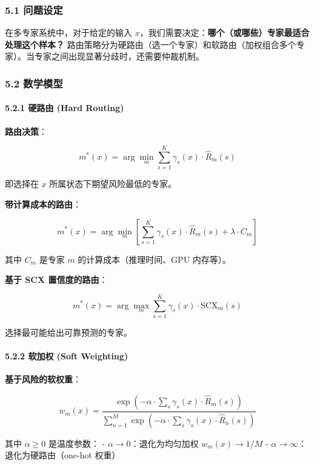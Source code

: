 \documentclass[
  12pt,
]{ctexart}
\begin{document}
\subsubsection{5.1 问题设定}\label{ux95eeux9898ux8bbeux5b9a-4}

在多专家系统中，对于给定的输入
\(x\)，我们需要决定：\textbf{哪个（或哪些）专家最适合处理这个样本？}
路由策略分为硬路由（选一个专家）和软路由（加权组合多个专家）。当专家之间出现显著分歧时，还需要仲裁机制。

\subsubsection{5.2 数学模型}\label{ux6570ux5b66ux6a21ux578b-4}

\paragraph{5.2.1 硬路由 (Hard
Routing)}\label{ux786cux8defux7531-hard-routing}

\textbf{路由决策}：

\[
m^*(x) = \arg\min_m \sum_{s=1}^K \gamma_s(x) \cdot \hat{R}_m(s)
\]

即选择在 \(x\) 所属状态下期望风险最低的专家。

\textbf{带计算成本的路由}：

\[
m^*(x) = \arg\min_m \left[\sum_{s=1}^K \gamma_s(x) \cdot \hat{R}_m(s) + \lambda \cdot C_m\right]
\]

其中 \(C_m\) 是专家 \(m\) 的计算成本（推理时间、GPU 内存等）。

\textbf{基于 SCX 置信度的路由}：

\[
m^*(x) = \arg\max_m \sum_{s=1}^K \gamma_s(x) \cdot \text{SCX}_m(s)
\]

选择最可能给出可靠预测的专家。

\paragraph{5.2.2 软加权 (Soft
Weighting)}\label{ux8f6fux52a0ux6743-soft-weighting}

\textbf{基于风险的软权重}：

\[
w_m(x) = \frac{\exp\left(-\alpha \cdot \sum_s \gamma_s(x) \cdot \hat{R}_m(s)\right)}{\sum_{n=1}^M \exp\left(-\alpha \cdot \sum_s \gamma_s(x) \cdot \hat{R}_n(s)\right)}
\]

其中 \(\alpha \geq 0\) 是温度参数： - \(\alpha \to 0\)：退化为均匀加权
\(w_m(x) \to 1/M\) - \(\alpha \to \infty\)：退化为硬路由（one-hot 权重）
\end{document}
